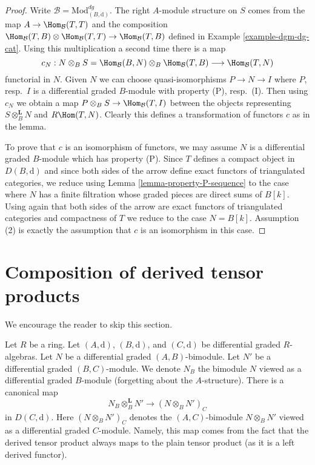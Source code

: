\begin{proof}
Write $\mathcal{B} = \text{Mod}^{dg}_{(B, \text{d})}$.
The right $A$-module structure on $S$ comes from the map
$A \to \Hom_\mathcal{B}(T, T)$ and the composition
$\Hom_\mathcal{B}(T, B) \otimes \Hom_\mathcal{B}(T, T)
\to \Hom_\mathcal{B}(T, B)$ defined in Example \ref{example-dgm-dg-cat}.
Using this multiplication a second time there is a map
$$
c_N :
N \otimes_B S = \Hom_\mathcal{B}(B, N) \otimes_B \Hom_\mathcal{B}(T, B)
\longrightarrow
\Hom_\mathcal{B}(T, N)
$$
functorial in $N$. Given $N$ we can choose quasi-isomorphisms
$P \to N \to I$ where $P$, resp.\ $I$ is a differential graded $B$-module
with property (P), resp.\ (I). Then using $c_N$ we obtain a map
$P \otimes_B S \to \Hom_\mathcal{B}(T, I)$ between the objects
representing $S \otimes_B^\mathbf{L} N$ and $R\Hom(T, N)$.
Clearly this defines a transformation of functors $c$ as in the lemma.

\medskip\noindent
To prove that $c$ is an isomorphism of functors, we may
assume $N$ is a differential graded $B$-module which
has property (P). Since $T$ defines a compact object in
$D(B, \text{d})$ and since both sides of the arrow define
exact functors of triangulated categories, we reduce using
Lemma \ref{lemma-property-P-sequence}
to the case where $N$ has a finite filtration whose
graded pieces are direct sums of $B[k]$. Using again that
both sides of the arrow are exact functors of triangulated
categories and compactness of $T$ we reduce to
the case $N = B[k]$. Assumption (2) is exactly the
assumption that $c$ is an isomorphism in this case.
\end{proof}






\section{Composition of derived tensor products}
\label{section-compose-tensor-functors}

\noindent
We encourage the reader to skip this section.

\medskip\noindent
Let $R$ be a ring. Let $(A, \text{d})$, $(B, \text{d})$, and
$(C, \text{d})$ be differential graded $R$-algebras.
Let $N$ be a differential graded $(A, B)$-bimodule.
Let $N'$ be a differential graded $(B, C)$-module.
We denote $N_B$ the bimodule $N$ viewed as a differential graded
$B$-module (forgetting about the $A$-structure). There is a canonical map
\begin{equation}
\label{equation-plain-versus-derived}
N_B \otimes_B^\mathbf{L} N'
\longrightarrow
(N \otimes_B N')_C
\end{equation}
in $D(C, \text{d})$. Here $(N \otimes_B N')_C$ denotes the
$(A, C)$-bimodule $N \otimes_B N'$ viewed as a
differential graded $C$-module. Namely, this map
comes from the fact that the derived tensor product always maps to the
plain tensor product (as it is a left derived functor).

